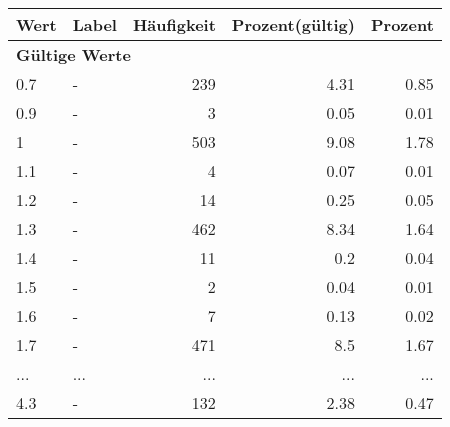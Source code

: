      \begin{longtable}{lXrrr}
     \toprule
     \textbf{Wert} & \textbf{Label} & \textbf{Häufigkeit} & \textbf{Prozent(gültig)} & \textbf{Prozent} \\
     \endhead
     \midrule
     \multicolumn{5}{l}{\textbf{Gültige Werte}}\\
        0.7 & \multicolumn{1}{X}{-} & %
          \num{239} &
          \num[round-mode=places,round-precision=2]{4.31} &
          \num[round-mode=places,round-precision=2]{0.85} \\
        0.9 & \multicolumn{1}{X}{-} & %
          \num{3} &
          \num[round-mode=places,round-precision=2]{0.05} &
          \num[round-mode=places,round-precision=2]{0.01} \\
        1 & \multicolumn{1}{X}{-} & %
          \num{503} &
          \num[round-mode=places,round-precision=2]{9.08} &
          \num[round-mode=places,round-precision=2]{1.78} \\
        1.1 & \multicolumn{1}{X}{-} & %
          \num{4} &
          \num[round-mode=places,round-precision=2]{0.07} &
          \num[round-mode=places,round-precision=2]{0.01} \\
        1.2 & \multicolumn{1}{X}{-} & %
          \num{14} &
          \num[round-mode=places,round-precision=2]{0.25} &
          \num[round-mode=places,round-precision=2]{0.05} \\
        1.3 & \multicolumn{1}{X}{-} & %
          \num{462} &
          \num[round-mode=places,round-precision=2]{8.34} &
          \num[round-mode=places,round-precision=2]{1.64} \\
        1.4 & \multicolumn{1}{X}{-} & %
          \num{11} &
          \num[round-mode=places,round-precision=2]{0.2} &
          \num[round-mode=places,round-precision=2]{0.04} \\
        1.5 & \multicolumn{1}{X}{-} & %
          \num{2} &
          \num[round-mode=places,round-precision=2]{0.04} &
          \num[round-mode=places,round-precision=2]{0.01} \\
        1.6 & \multicolumn{1}{X}{-} & %
          \num{7} &
          \num[round-mode=places,round-precision=2]{0.13} &
          \num[round-mode=places,round-precision=2]{0.02} \\
        1.7 & \multicolumn{1}{X}{-} & %
          \num{471} &
          \num[round-mode=places,round-precision=2]{8.5} &
          \num[round-mode=places,round-precision=2]{1.67} \\
       ... & ... & ... & ... & ... \\
        4.3 & \multicolumn{1}{X}{-} & %
          \num{132} &
          \num[round-mode=places,round-precision=2]{2.38} &
          \num[round-mode=places,round-precision=2]{0.47} \\


\end{longtable}
